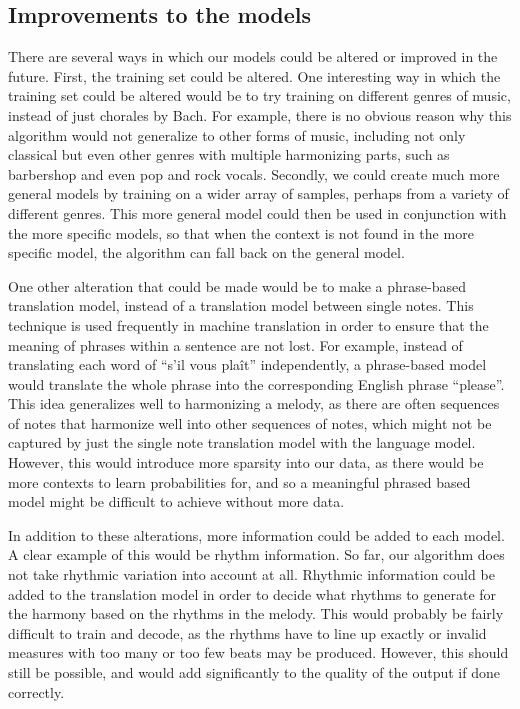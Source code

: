 \documentclass{sig-alternate}
\begin{document}
\subsection{Improvements to the models}
There are several ways in which our models could be altered or improved in the future. First, the training set could be altered. One interesting way in which the training set could be altered would be to try training on different genres of music, instead of just chorales by Bach. For example, there is no obvious reason why this algorithm would not generalize to other forms of music, including not only classical but even other genres with multiple harmonizing parts, such as barbershop and even pop and rock vocals. Secondly, we could create much more general models by training on a wider array of samples, perhaps from a variety of different genres. This more general model could then be used in conjunction with the more specific models, so that when the context is not found in the more specific model, the algorithm can fall back on the general model.

One other alteration that could be made would be to make a phrase-based translation model, instead of a translation model between single notes. This technique is used frequently in machine translation in order to ensure that the meaning of phrases within a sentence are not lost. For example, instead of translating each word of ``s'il vous pla\^{i}t'' independently, a phrase-based model would translate the whole phrase into the corresponding English phrase ``please''. This idea generalizes well to harmonizing a melody, as there are often sequences of notes that harmonize well into other sequences of notes, which might not be captured by just the single note translation model with the language model. However, this would introduce more sparsity into our data, as there would be more contexts to learn probabilities for, and so a meaningful phrased based model might be difficult to achieve without more data.

In addition to these alterations, more information could be added to each model. A clear example of this would be rhythm information. So far, our algorithm does not take rhythmic variation into account at all. Rhythmic information could be added to the translation model in order to decide what rhythms to generate for the harmony based on the rhythms in the melody. This would probably be fairly difficult to train and decode, as the rhythms have to line up exactly or invalid measures with too many or too few beats may be produced. However, this should still be possible, and would add significantly to the quality of the output if done correctly.
\label{sec:remaining_work}



\label{app}
\end{document}
